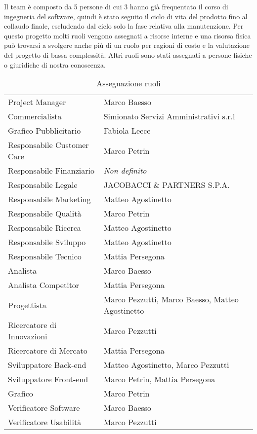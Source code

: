 Il team \`{e} composto da 5 persone di cui 3 hanno gi\`{a} frequentato il corso di ingegneria del 
software, quindi \`{e} stato seguito il ciclo di vita del prodotto fino al collaudo finale, escludendo dal ciclo solo la fase relativa alla manutenzione. Per questo progetto molti ruoli vengono assegnati a risorse interne e una risorsa fisica pu\`{o} trovarsi a svolgere anche pi\`{u} di un ruolo per ragioni di costo e la valutazione del progetto di bassa complessit\`{a}. Altri ruoli sono stati assegnati a persone fisiche o giuridiche di nostra conoscenza.

\begin{table}[H]
\begin{longtable}{|>{\centering}p{5cm}| >{\centering}m{9cm}|}
    \hline
    \multicolumn{1}{|c|}{\textbf{Ruolo}} &
    \multicolumn{1}{c|}{\textbf{Risorse assegnate}} \\ %
      \hline
		Project Manager & Marco Baesso \tabularnewline 
		Commercialista & Simionato Servizi Amministrativi s.r.l \tabularnewline 
		Grafico Pubblicitario & Fabiola Lecce \tabularnewline 	 
		Responsabile Customer Care & Marco Petrin \tabularnewline 
		Responsabile Finanziario & \textit{Non definito} \tabularnewline 
		Responsabile Legale & JACOBACCI \& PARTNERS S.P.A.  \tabularnewline 
		Responsabile Marketing & Matteo Agostinetto  \tabularnewline 
		Responsabile Qualit\`{a} & Marco Petrin \tabularnewline 
		Responsabile Ricerca &  Matteo Agostinetto \tabularnewline 
		Responsabile Sviluppo & Matteo Agostinetto  \tabularnewline 
		Responsabile Tecnico & Mattia Persegona \tabularnewline 
		Analista & Marco Baesso \tabularnewline 
		Analista Competitor &  Mattia Persegona\tabularnewline 
		Progettista & Marco Pezzutti, Marco Baesso, Matteo Agostinetto \tabularnewline 
		Ricercatore di Innovazioni & Marco Pezzutti \tabularnewline 
		Ricercatore di Mercato & Mattia Persegona \tabularnewline 
		Sviluppatore Back-end & Matteo Agostinetto, Marco Pezzutti \tabularnewline 
		Sviluppatore Front-end & Marco Petrin, Mattia Persegona \tabularnewline 
		Grafico & Marco Petrin \tabularnewline 
		Verificatore Software & Marco Baesso \tabularnewline 
		Verificatore Usabilit\`{a} & Marco Pezzutti \tabularnewline 
        \hline
\end{longtable}
\caption{Assegnazione ruoli}
\label{tab: Tabella assegnazione ruoli}
\end{table}